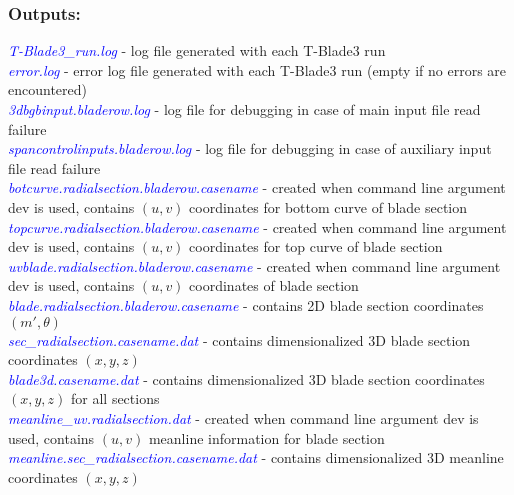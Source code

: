 \documentclass[8pt]{article}
\begin{document}
\subsubsection{Outputs:}\label{outputs}
\noindent
\textit{\textcolor{blue}{T-Blade3\_run.log}} - log file generated with each T-Blade3 run\\
\textit{\textcolor{blue}{error.log}} - error log file generated with each T-Blade3 run (empty if no errors are encountered)\\
\textit{\textcolor{blue}{3dbgbinput.bladerow.log}} - log file for debugging in case of main input file read failure\\
\textit{\textcolor{blue}{spancontrolinputs.bladerow.log}} - log file for debugging in case of auxiliary input file read failure\\
\textit{\textcolor{blue}{botcurve.radialsection.bladerow.casename}} - created when command line argument {\selectfont dev} is used, contains $(u,v)$ coordinates for bottom curve of blade section\\
\textit{\textcolor{blue}{topcurve.radialsection.bladerow.casename}} - created when command line argument {\selectfont dev} is used, contains $(u,v)$ coordinates for top curve of blade section\\
\textit{\textcolor{blue}{uvblade.radialsection.bladerow.casename}} - created when command line argument {\selectfont dev} is used, contains $(u,v)$ coordinates of blade section\\
\textit{\textcolor{blue}{blade.radialsection.bladerow.casename}} - contains 2D blade section coordinates $(m',\theta)$\\
\textit{\textcolor{blue}{sec\_radialsection.casename.dat}} - contains dimensionalized 3D blade section coordinates $(x,y,z)$\\
\textit{\textcolor{blue}{blade3d.casename.dat}} - contains dimensionalized 3D blade section coordinates $(x,y,z)$ for all sections\\
\textit{\textcolor{blue}{meanline\_uv.radialsection.dat}} - created when command line argument {\selectfont dev} is used, contains $(u,v)$ meanline information for blade section\\
\textit{\textcolor{blue}{meanline.sec\_radialsection.casename.dat}} - contains dimensionalized 3D meanline coordinates $(x,y,z)$\\
\end{document}
